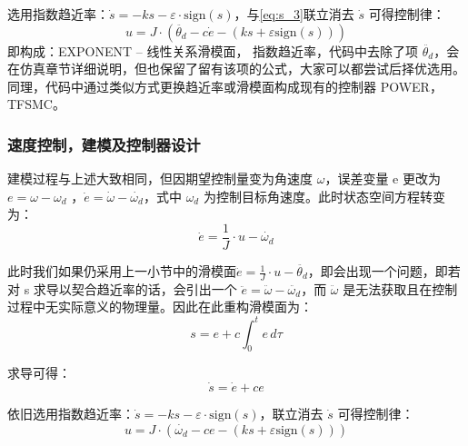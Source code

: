 \documentclass[12pt]{article}
\begin{document}
        \par
        选用指数趋近率：$\dot{s} = -k s - \varepsilon \cdot \text{sign}(s)$，与\cref{eq:s_3}联立消去 $\dot{s}$ 可得控制律：
            \begin{equation}
                u = J \cdot (\ddot{\theta_d} -c \dot{e} - (k s + \varepsilon \text{sign}(s)))
                \label{eq:s_4}
            \end{equation}
        即构成：EXPONENT -- 线性关系滑模面， 指数趋近率，代码中去除了项 $\ddot{\theta_d}$，会在仿真章节详细说明，但也保留了留有该项的公式，大家可以都尝试后择优选用。同理，代码中通过类似方式更换趋近率或滑模面构成现有的控制器 POWER，TFSMC。

        \subsubsection{速度控制，建模及控制器设计}
        建模过程与上述大致相同，但因期望控制量变为角速度 $\omega$，误差变量 e 更改为 $e = \omega - \omega_d$ ，$\dot{e} = \dot{\omega} - \dot{\omega_d}$，式中 $\omega_d$ 为控制目标角速度。此时状态空间方程转变为：
            \begin{equation}
                \dot{e} = \frac{1}{J} \cdot u - \dot{\omega_d}
                \label{eq:e_2}
            \end{equation}
        \par
        此时我们如果仍采用上一小节中的滑模面$\ddot{e} = \frac{1}{J} \cdot u - \ddot{\theta_d} $，即会出现一个问题，即若对 s 求导以契合趋近率的话，会引出一个 $\ddot{e} = \ddot{\omega} - \ddot{\omega_d}$，而 $\ddot{\omega}$ 是无法获取且在控制过程中无实际意义的物理量。因此在此重构滑模面为：
            \begin{equation}
                s = e + c \int_0^t e\, d\tau
                \label{eq:s_5}
            \end{equation}
        \par
        求导可得：
            \begin{equation}
                \dot{s} = \dot{e} + ce
                \label{eq:s_6}
            \end{equation}
        \par
        依旧选用指数趋近率：$\dot{s} = -k s - \varepsilon \cdot \text{sign}(s)$，联立消去 $\dot{s}$ 可得控制律：
            \begin{equation}
                u = J \cdot (\dot{\omega_d} -c e - (k s + \varepsilon \text{sign}(s)))
                \label{eq:s_7}
            \end{equation}
\end{document}
